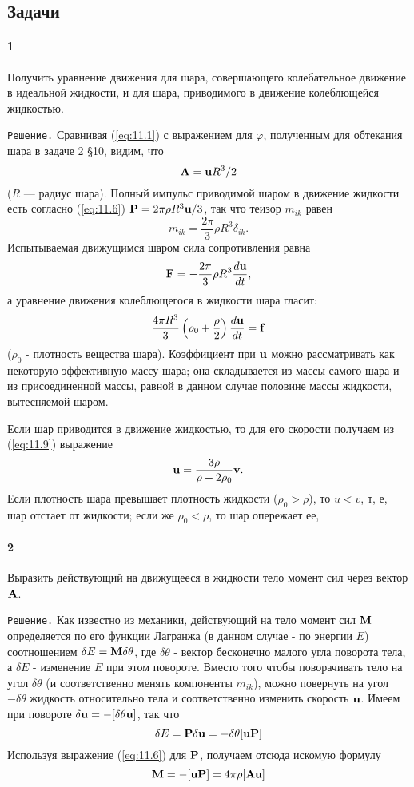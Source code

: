 \subsection*{Задачи}
\paragraph*{1}
Получить уравнение движения для шара, совершающего колебательное движение в
идеальной жидкости, и для шара, приводимого в движение колеблющейся жидкостью.

\texttt{Решение.} Сравнивая (\ref{eq:11.1}) с выражением для $\varphi$, полученным для
обтекания шара в задаче 2 \S10, видим, что
\[
   \mathbf{A} = \mathbf{u} R^3/2
\]
($R$ — радиус шара). Полный импульс приводимой шаром в движение жидкости есть
согласно (\ref{eq:11.6}) $\mathbf{P} = 2\pi \rho R^3 \mathbf{u}/3$, так что теизор $m_{ik}$
равен
\[
   m_{ik} = \frac{2\pi}{3}\rho R^3 \delta_{ik}.
\]
Испытываемая движущимся шаром сила сопротивления равна
\[
   \mathbf{F} = - \frac{2\pi}{3}\rho R^3 \frac{d{\mathbf{u}}}{d{t}},
\]
а уравнение движения колеблющегося в жидкости шара гласит:
\[
   \frac{4\pi R^3}{3}\left( \rho_0 + \frac{\rho}{2} \right)\frac{d{\mathbf{u}}}{d{t}} =
   \mathbf{f}
\]
($\rho_0$ - плотность вещества шара). Коэффициент при $\mathbf{u}$ можно
рассматривать как некоторую эффективную массу шара; она складывается из массы
самого шара и из присоединенной массы, равной в данном случае половине массы
жидкости, вытесняемой шаром.

Если шар приводится в движение жидкостью, то для его скорости
получаем из (\ref{eq:11.9}) выражение
\[
   \mathbf{u} =\frac{3\rho}{\rho + 2\rho_0}{\mathbf{v}}.
\]
Если плотность шара превышает плотность жидкости ($\rho_0 > \rho$), то $u<v$, т,
е, шар отстает от жидкости; если же $\rho_0 < \rho$, то шар опережает ее,

\paragraph*{2}
Выразить действующий на движущееся в жидкости тело момент сил через вектор
$\mathbf{A}$.

\texttt{Решение.} Как известно из механики, действующий на тело момент сил
$\mathbf{M}$ определяется по его функции Лагранжа (в данном случае - по энергии
$E$) соотношением $\delta E = \mathbf{M\delta\theta}$, где $\delta\theta$ - вектор
бесконечно малого угла поворота тела, а $\delta E$ - изменение $E$ при этом
повороте. Вместо того чтобы поворачивать тело на угол $\delta\theta$ (и
соответственно менять компоненты $m_{ik}$), можно повернуть на угол
$-\delta\theta$ жидкость относительно тела и соответственно изменить скорость
$\mathbf{u}$. Имеем при повороте $\delta\mathbf{u} = - \lbrack \delta\theta\mathbf{u}
\rbrack$, так что
\[
   \delta E = \mathbf{P} \delta \mathbf{u} = - \delta\theta \lbrack \mathbf{uP} \rbrack
\]
Используя выражение (\ref{eq:11.6}) для $\mathbf{P}$, получаем отсюда искомую
формулу
\[
   \mathbf{M} = - \lbrack \mathbf{uP} \rbrack = 4\pi\rho\lbrack\mathbf{Au}\rbrack
\]

